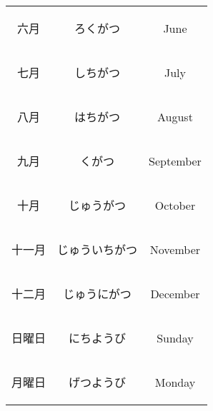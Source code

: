 \begin{center}
\begin{table}[H]
\begin{tabular}{ccc}
		{\begin{CJK}{UTF8}{min} 六月 \end{CJK}} & {\begin{CJK}{UTF8}{min} ろくがつ \end{CJK}} & June \\
		{\begin{CJK}{UTF8}{min} 七月 \end{CJK}} & {\begin{CJK}{UTF8}{min} しちがつ \end{CJK}} & July \\
		{\begin{CJK}{UTF8}{min} 八月 \end{CJK}} & {\begin{CJK}{UTF8}{min} はちがつ \end{CJK}} & August \\
		{\begin{CJK}{UTF8}{min} 九月 \end{CJK}} & {\begin{CJK}{UTF8}{min} くがつ \end{CJK}} & September \\
		{\begin{CJK}{UTF8}{min} 十月 \end{CJK}} & {\begin{CJK}{UTF8}{min} じゅうがつ \end{CJK}} & October \\
		{\begin{CJK}{UTF8}{min} 十一月 \end{CJK}} & {\begin{CJK}{UTF8}{min} じゅういちがつ \end{CJK}} & November \\
		{\begin{CJK}{UTF8}{min} 十二月 \end{CJK}} & {\begin{CJK}{UTF8}{min} じゅうにがつ \end{CJK}} & December \\
		\midrule
		{\begin{CJK}{UTF8}{min} 日曜日 \end{CJK}} & {\begin{CJK}{UTF8}{min} にちようび \end{CJK}} & Sunday \\
		{\begin{CJK}{UTF8}{min} 月曜日 \end{CJK}} & {\begin{CJK}{UTF8}{min} げつようび \end{CJK}} & Monday \\

\end{tabular}
\end{table}
\end{center}
